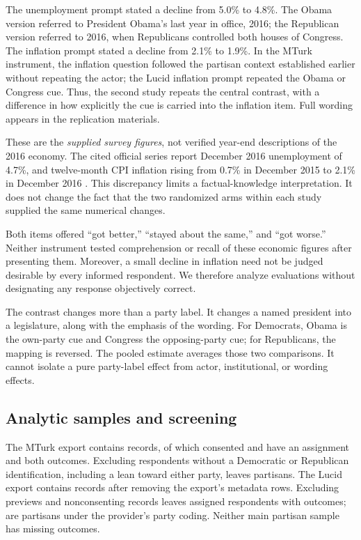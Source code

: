 \documentclass[11pt,letterpaper]{article}
\begin{document}
The unemployment prompt stated a decline from 5.0\% to 4.8\%. The Obama version referred to President Obama's last year in office, 2016; the Republican version referred to 2016, when Republicans controlled both houses of Congress. The inflation prompt stated a decline from 2.1\% to 1.9\%. In the MTurk instrument, the inflation question followed the partisan context established earlier without repeating the actor; the Lucid inflation prompt repeated the Obama or Congress cue. Thus, the second study repeats the central contrast, with a difference in how explicitly the cue is carried into the inflation item. Full wording appears in the replication materials.

These are the \emph{supplied survey figures}, not verified year-end descriptions of the 2016 economy. The cited official series report December 2016 unemployment of 4.7\%, and twelve-month CPI inflation rising from 0.7\% in December 2015 to 2.1\% in December 2016 \citep{blsjobs,blscpi}. This discrepancy limits a factual-knowledge interpretation. It does not change the fact that the two randomized arms within each study supplied the same numerical changes.

Both items offered ``got better,'' ``stayed about the same,'' and ``got worse.'' Neither instrument tested comprehension or recall of these economic figures after presenting them. Moreover, a small decline in inflation need not be judged desirable by every informed respondent. We therefore analyze evaluations without designating any response objectively correct.

The contrast changes more than a party label. It changes a named president into a legislature, along with the emphasis of the wording. For Democrats, Obama is the own-party cue and Congress the opposing-party cue; for Republicans, the mapping is reversed. The pooled estimate averages those two comparisons. It cannot isolate a pure party-label effect from actor, institutional, or wording effects.

\subsection{Analytic samples and screening}
The MTurk export contains \MTurkExport{} records, of which \MTurkEligible{} consented and have an assignment and both outcomes. Excluding respondents without a Democratic or Republican identification, including a lean toward either party, leaves \MTurkN{} partisans. The Lucid export contains \LucidExport{} records after removing the export's metadata rows. Excluding previews and nonconsenting records leaves \LucidEligible{} assigned respondents with outcomes; \LucidN{} are partisans under the provider's party coding. Neither main partisan sample has missing outcomes.
\end{document}

